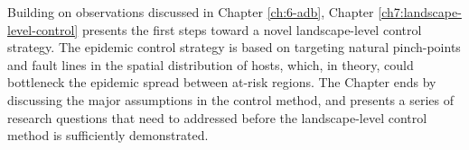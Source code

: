 Building on observations discussed in Chapter \ref{ch:6-adb}, Chapter \ref{ch7:landscape-level-control} presents the first steps toward a novel
landscape-level control strategy. The epidemic control strategy is based on targeting natural
pinch-points and fault lines in the spatial distribution of hosts, which, in theory, could bottleneck the epidemic spread
between at-risk regions. The Chapter ends by discussing the major assumptions in the control method, and presents a series of research questions that need 
to addressed before the landscape-level control method is sufficiently demonstrated.